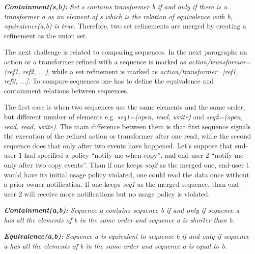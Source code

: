 \documentclass{sig-alternate}
\begin{document}
\textbf{\textit{Containment(s,b):}} \textit{Set s contains transformer b if and only if there is a transformer a as an element of s which is the relation of equivalence with b, equivalence(a,b) is true.}
Therefore, two set refinements are merged by creating a refinement as the union set.


The next challenge is related to comparing sequences.
In the next paragraphs an action or a transformer refined with a sequence is marked as \textit{action/transformer=(ref1, ref2, ...)},
while a set refinement is marked as \textit{action/transformer=[ref1, ref2, ...]}.
To compare sequences one has to define the equivalence and containment relations between sequences.

The first case is when two sequences use the same elements and the same order, but different number of elements
e.g. \textit{seq1=(open, read, write)} and \textit{seq2=(open, read, read, write)}.
The main difference between them is that 
first sequence signals the execution of the refined action or transformer after one read,
while the second sequence does that only after two events have happened.
Let's suppose that end-user 1 had specified a policy ``notify me when copy'',  and end-user 2 ``notify me only after two copy events''.
Than if one keeps \textit{seq2} as the merged one, end-user 1 would have its initial usage policy violated, 
one could read the data once without a prior owner notification.
If one keeps \textit{seq1} as the merged sequence, than end-user 2 will receive more notifications but no usage policy is violated.

\textbf{\textit{Containment(a,b):}} \textit{Sequence a contains sequence b if and only if sequence a has all the elements of b in the same order and sequence a is shorter than b.}

\textbf{\textit{Equivalence(a,b):}} \textit{Sequence a is equivalent to sequence b if and only if sequence a has all the elements of b in the same order and sequence a is equal to b.}

\end{document}

